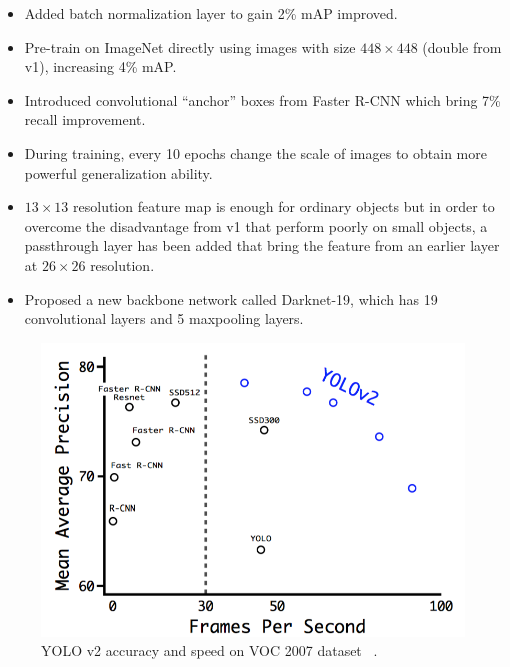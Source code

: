 \begin{itemize}
    \item Added batch normalization layer to gain 2\% mAP improved.

    \item Pre-train on ImageNet directly using images with size $448 \times
    448$ (double from v1), increasing 4\% mAP.

    \item Introduced convolutional ``anchor'' boxes from Faster R-CNN which
    bring 7\% recall improvement.

    \item During training, every 10 epochs change the scale of images to obtain
    more powerful generalization ability.

    \item $13 \times 13$ resolution feature map is enough for ordinary objects
    but in order to overcome the disadvantage from v1 that perform poorly on
    small objects, a passthrough layer has been added that bring the feature
    from an earlier layer at $26 \times 26$ resolution.

    \item Proposed a new backbone network called Darknet-19, which has 19
    convolutional layers and 5 maxpooling layers.
\end{itemize}

\begin{figure}
    \begin{center}
    \includegraphics[scale=0.7]{figures/yolov2_speed_and_acc.png}
    \end{center}
    \caption{YOLO v2 accuracy and speed on VOC 2007 dataset
    ~\protect\cite{yolov2-paper-2016}.}
    \label{fig:yolo-v2-s-acc}
\end{figure}

